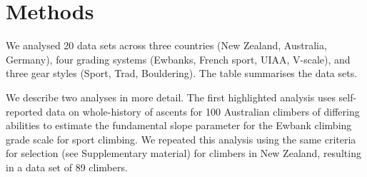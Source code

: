 \documentclass{article}
\begin{document}
%
%
%
%
%
%

\section*{Methods}

We analysed 20 data sets across three countries (New Zealand, Australia, Germany),  four grading systems (Ewbanks, French sport, UIAA, V-scale), and three gear styles (Sport, Trad, Bouldering). The table summarises the data sets.


\afterpage{%
    \clearpage%
    \thispagestyle{empty}%
    \begin{landscape}%
       
    \end{landscape}
    \clearpage%
}


We describe two analyses in more detail. The first highlighted analysis uses self-reported data on whole-history of ascents for 100 Australian climbers of differing abilities to estimate the fundamental slope parameter for the Ewbank climbing grade scale for sport climbing. We repeated this analysis using the same criteria for selection (see Supplementary material) for climbers in New Zealand, resulting in a data set of 89 climbers. 
\end{document}
